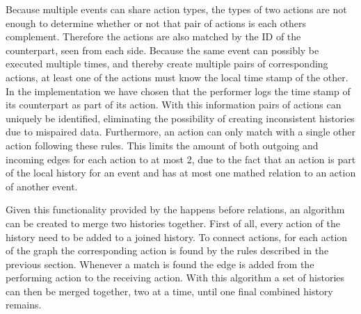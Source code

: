 	\newpar Because multiple events can share action types, the types of two actions are not enough to determine whether or not that pair of actions is each others complement. Therefore the actions are also matched by the ID of the counterpart, seen from each side. Because the same event can possibly be executed multiple times, and thereby create multiple pairs of corresponding actions, at least one of the actions must know the local time stamp of the other. In the implementation we have chosen that the performer logs the time stamp of its counterpart as part of its action. With this information pairs of actions can uniquely be identified, eliminating the possibility of creating inconsistent histories due to mispaired data. Furthermore, an action can only match with a single other action following these rules. This limits the amount of both outgoing and incoming edges for each action to at most 2, due to the fact that an action is part of the local history for an event and has at most one mathed relation to an action of another event.
	
	Given this functionality provided by the happens before relations, an algorithm can be created to merge two histories together. First of all, every action of the history need to be added to a joined history. To connect actions, for each action of the graph the corresponding action is found by the rules described in the previous section. Whenever a match is found the edge is added from the performing action to the receiving action. With this algorithm a set of histories can then be merged together, two at a time, until one final combined history remains.

